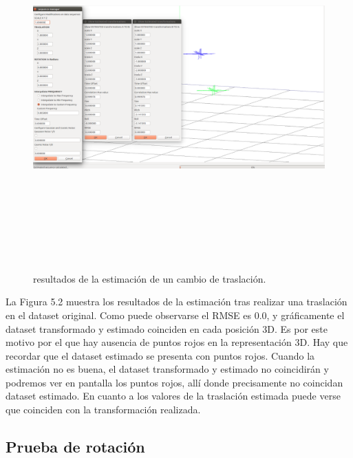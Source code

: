 \begin{figure}[H]
\label{fig:traslaTest}\includegraphics[height=14.0cm,width=18.0cm]{img/cap6/Traslation_abba.png}
\hspace{0.5cm}


\caption{resultados de la estimación de un cambio de traslación.}
\end{figure}


La Figura 5.2 muestra los resultados de la estimación tras realizar una traslación en el dataset original. Como puede observarse el RMSE es 0.0, y gráficamente el dataset transformado y estimado coinciden en cada posición 3D. Es por este motivo por el que hay ausencia de puntos rojos en la representación 3D. Hay que recordar que el dataset estimado se presenta con puntos rojos. Cuando la estimación no es buena, el dataset transformado y estimado no coincidirán y podremos ver en pantalla los puntos rojos, allí donde precisamente no coincidan dataset estimado. En cuanto a los valores de la traslación estimada puede verse que coinciden con la transformación realizada.

\subsection{Prueba de rotación}

